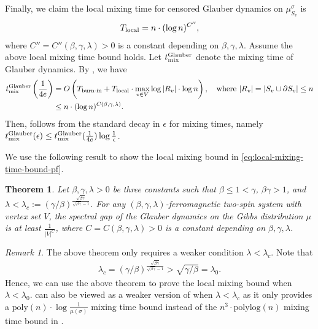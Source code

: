 \documentclass[11pt]{amsart}
\newcommand{\defeq}{:=}
\newtheorem{theorem}{Theorem}
\theoremstyle{definition}
\theoremstyle{remark}
\newtheorem*{remark}{Remark}
\begin{document}
Finally, we claim the local mixing time for censored Glauber dynamics on $\mu^\sigma_{S_v}$ is 
\begin{align}\label{eq:local-mixing-time-bound-pf}
    T_{\textnormal{local}} = n \cdot (\log n)^{C''},
\end{align}
where $C'' = C''(\beta,\gamma,\lambda) > 0$ is a constant depending on $\beta,\gamma,\lambda$.
Assume the above local mixing time bound holds.
Let $t_{\textnormal{mix}}^{\textnormal{Glauber}}$ denote the mixing time of Glauber dynamics.
By , we have
\begin{align*}
t_{\textnormal{mix}}^{\textnormal{Glauber}}\left(\frac{1}{4e}\right) &= O\left(T_{\textnormal{burn-in}} + T_{\textnormal{local}} \cdot \max_{v \in V}\log |R_v|\cdot \log n\right), \quad \text{where } |R_v| = |S_v \cup \partial S_v| \leq n\\
&\leq n \cdot (\log n)^{C(\beta,\gamma,\lambda)}.
\end{align*}
Then,  follows from the standard decay in $\epsilon$ for mixing times, namely $t_{\textnormal{mix}}^{\textnormal{Glauber}}(\epsilon) \leq t_{\textnormal{mix}}^{\textnormal{Glauber}}(\frac{1}{4e})\log \frac{1}{\epsilon}$.


We use the following result to show the local mixing bound in \eqref{eq:local-mixing-time-bound-pf}.

\begin{theorem}\label{thm:local-mixing-bound}
    Let $\beta,\gamma,\lambda > 0$ be three constants such that $\beta \leq 1 < \gamma$, $\beta\gamma > 1$, and $\lambda < \lambda_c \defeq (\gamma/\beta)^{\frac{\sqrt{\beta \gamma}}{\sqrt{\beta \gamma}-1}} $. 
    For any $(\beta,\gamma,\lambda)$-ferromagnetic two-spin system with vertex set $V$, the spectral gap of the Glauber dynamics on the Gibbs distribution $\mu$ is at least $\frac{1}{|V|^{C}}$, where $C = C(\beta,\gamma,\lambda) > 0$ is a constant depending on $\beta,\gamma,\lambda$.
\end{theorem}

\begin{remark}
The above theorem only requires a weaker condition $\lambda < \lambda_c$. Note that 
\begin{align*}
\lambda_c = (\gamma/\beta)^{\frac{\sqrt{\beta \gamma}}{\sqrt{\beta \gamma}-1}} > \sqrt{\gamma/\beta} = \lambda_0.
\end{align*}
Hence, we can use the above theorem to prove the local mixing bound when $\lambda < \lambda_0$.  can also be viewed as a weaker version of  when $\lambda < \lambda_c$ as it only provides a $\mathrm{poly}(n) \cdot \log \frac{1}{\mu(\sigma)}$ mixing time bound instead of the $n^3 \cdot \mathrm{polylog}(n)$ mixing time bound in .
\end{remark}
\end{document}
